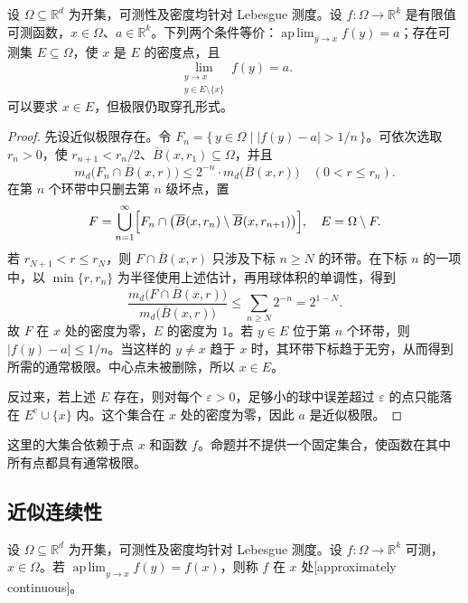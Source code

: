 \begin{proposition}
\label{b1:prop:approximate-limit-density-one}
设 \(\Omega\subseteq\mathbb R^d\) 为开集，可测性及密度均针对 Lebesgue 测度。设 \(f:\Omega\to\mathbb R^k\) 是有限值可测函数，\(x\in\Omega\)、\(a\in\mathbb R^k\)。下列两个条件等价：\(\operatorname*{ap\,lim}_{y\to x}f(y)=a\)；存在可测集 \(E\subseteq\Omega\)，使 \(x\) 是 \(E\) 的密度点，且
\[
\lim_{\substack{y\to x\\y\in E\setminus\{x\}}}f(y)=a.
\]
可以要求 \(x\in E\)，但极限仍取穿孔形式。
\end{proposition}
\begin{proof}
先设近似极限存在。令 \(F_n=\{\,y\in\Omega\mid |f(y)-a|>1/n\,\}\)。可依次选取 \(r_n>0\)，使 \(r_{n+1}<r_n/2\)、\(\overline B(x,r_1)\subseteq\Omega\)，并且
\[
m_d\bigl(F_n\cap\overline B(x,r)\bigr)
\leq2^{-n}\cdot m_d\bigl(\overline B(x,r)\bigr)
\quad(0<r\leq r_n).
\]
在第 \(n\) 个环带中只删去第 \(n\) 级坏点，置
\[
F=\bigcup_{n=1}^{\infty}
\Bigl[F_n\cap\bigl(\overline B(x,r_n)\setminus\overline B(x,r_{n+1})\bigr)\Bigr],
\quad E=\Omega\setminus F.
\]
若 \(r_{N+1}<r\leq r_N\)，则 \(F\cap\overline B(x,r)\) 只涉及下标 \(n\geq N\) 的环带。在下标 \(n\) 的一项中，以 \(\min\{r,r_n\}\) 为半径使用上述估计，再用球体积的单调性，得到
\[
\frac{m_d\bigl(F\cap\overline B(x,r)\bigr)}{m_d\bigl(\overline B(x,r)\bigr)}
\leq\sum_{n\geq N}2^{-n}=2^{1-N}.
\]
故 \(F\) 在 \(x\) 处的密度为零，\(E\) 的密度为 \(1\)。若 \(y\in E\) 位于第 \(n\) 个环带，则 \(|f(y)-a|\leq1/n\)。当这样的 \(y\ne x\) 趋于 \(x\) 时，其环带下标趋于无穷，从而得到所需的通常极限。中心点未被删除，所以 \(x\in E\)。

反过来，若上述 \(E\) 存在，则对每个 \(\varepsilon>0\)，足够小的球中误差超过 \(\varepsilon\) 的点只能落在 \(E^{\mathrm c}\cup\{x\}\) 内。这个集合在 \(x\) 处的密度为零，因此 \(a\) 是近似极限。
\end{proof}

这里的大集合依赖于点 \(x\) 和函数 \(f\)。命题并不提供一个固定集合，使函数在其中所有点都具有通常极限。

\subsection{近似连续性}
\label{b1:subsec:140502}

\begin{definition}
\label{b1:def:approximate-continuity}
设 \(\Omega\subseteq\mathbb R^d\) 为开集，可测性及密度均针对 Lebesgue 测度。设 \(f:\Omega\rightarrow\mathbb R^k\) 可测，\(x\in\Omega\)。若 \(\operatorname*{ap\,lim}_{y\to x}f(y)=f(x)\)，则称 \(f\) 在 \(x\) 处[approximately continuous]。
\end{definition}


